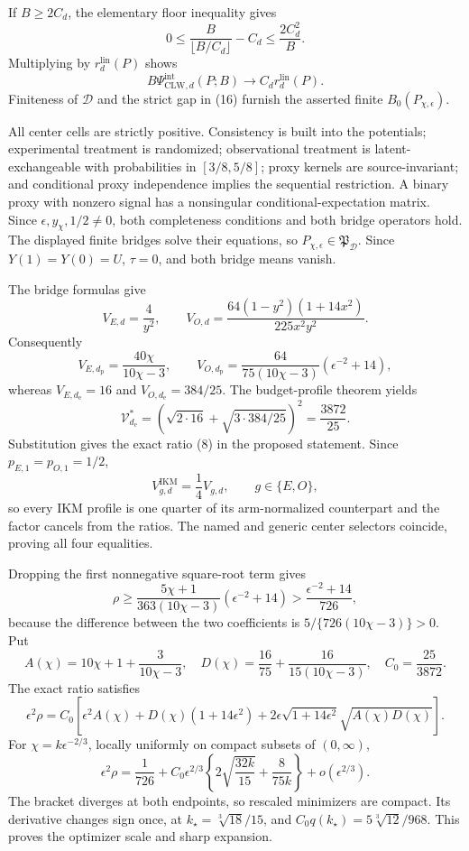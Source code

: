 If \(B\ge2C_d\), the elementary floor inequality gives
\[
 0\le \frac{B}{\lfloor B/C_d\rfloor}-C_d
 \le\frac{2C_d^2}{B}.                                     \tag{17}
\]
Multiplying by \(r_d^{\mathrm{lin}}(P)\) shows
\[
 B\Psi_{\mathrm{CLW},d}^{\mathrm{int}}(P;B)
 \longrightarrow C_dr_d^{\mathrm{lin}}(P).                \tag{18}
\]
Finiteness of \(\mathcal D\) and the strict gap in (16) furnish the asserted finite \(B_0(P_{\chi,\epsilon})\).

All center cells are strictly positive. Consistency is built into the potentials; experimental treatment is randomized; observational treatment is latent-exchangeable with probabilities in \([3/8,5/8]\); proxy kernels are source-invariant; and conditional proxy independence implies the sequential restriction. A binary proxy with nonzero signal has a nonsingular conditional-expectation matrix. Since \(\epsilon,y_\chi,1/2\ne0\), both completeness conditions and both bridge operators hold. The displayed finite bridges solve their equations, so \(P_{\chi,\epsilon}\in\mathfrak P_{\mathcal D}\). Since \(Y(1)=Y(0)=U\), \(\tau=0\), and both bridge means vanish.

The bridge formulas give
\[
 V_{E,d}=\frac4{y^2},
 \qquad
 V_{O,d}=\frac{64(1-y^2)(1+14x^2)}{225x^2y^2}.             \tag{19}
\]
Consequently
\[
 V_{E,d_{\mathrm p}}=\frac{40\chi}{10\chi-3},
 \qquad
 V_{O,d_{\mathrm p}}
 =\frac{64}{75(10\chi-3)}(\epsilon^{-2}+14),              \tag{20}
\]
whereas \(V_{E,d_{\mathrm e}}=16\) and \(V_{O,d_{\mathrm e}}=384/25\). The budget-profile theorem yields
\[
 \mathcal V_{d_{\mathrm e}}^*
 =\left(\sqrt{2\cdot16}+\sqrt{3\cdot384/25}\right)^2
 =\frac{3872}{25}.                                         \tag{21}
\]
Substitution gives the exact ratio (8) in the proposed statement. Since \(p_{E,1}=p_{O,1}=1/2\),
\[
 V_{g,d}^{\mathrm{IKM}}=\frac14V_{g,d},
 \qquad g\in\{E,O\},                                     \tag{22}
\]
so every IKM profile is one quarter of its arm-normalized counterpart and the factor cancels from the ratios. The named and generic center selectors coincide, proving all four equalities.

Dropping the first nonnegative square-root term gives
\[
 \rho\ge\frac{5\chi+1}{363(10\chi-3)}(\epsilon^{-2}+14)
 >\frac{\epsilon^{-2}+14}{726},                            \tag{23}
\]
because the difference between the two coefficients is \(5/\{726(10\chi-3)\}>0\). Put
\[
 A(\chi)=10\chi+1+\frac3{10\chi-3},
 \quad D(\chi)=\frac{16}{75}+\frac{16}{15(10\chi-3)},
 \quad C_0=\frac{25}{3872}.
\]
The exact ratio satisfies
\[
 \epsilon^2\rho
 =C_0\left[\epsilon^2A(\chi)+D(\chi)(1+14\epsilon^2)
 +2\epsilon\sqrt{1+14\epsilon^2}\sqrt{A(\chi)D(\chi)}\right]. \tag{24}
\]
For \(\chi=k\epsilon^{-2/3}\), locally uniformly on compact subsets of \((0,\infty)\),
\[
 \epsilon^2\rho
 =\frac1{726}+C_0\epsilon^{2/3}
 \left\{2\sqrt{\frac{32k}{15}}+\frac8{75k}\right\}
 +o(\epsilon^{2/3}).                                       \tag{25}
\]
The bracket diverges at both endpoints, so rescaled minimizers are compact. Its derivative changes sign once, at \(k_\star=\sqrt[3]{18}/15\), and \(C_0q(k_\star)=5\sqrt[3]{12}/968\). This proves the optimizer scale and sharp expansion.